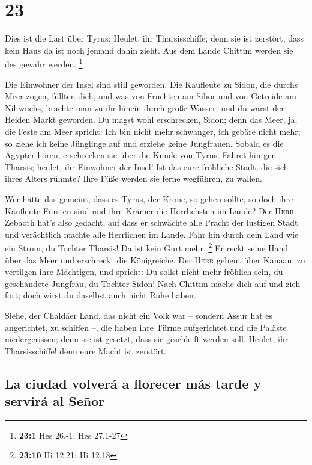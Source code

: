 \hypertarget{section-22}{%
\section{23}\label{section-22}}

 Dies ist die Last über Tyrus: Heulet, ihr Tharsisschiffe;
denn sie ist zerstört, dass kein Haus da ist noch jemand dahin zieht.
Aus dem Lande Chittim werden sie des gewahr werden. \footnote{\textbf{23:1}
  Hes 26,-1; Hes 27,1-27}

 Die Einwohner der Insel sind still geworden. Die
Kaufleute zu Sidon, die durchs Meer zogen, füllten dich, 
und was von Früchten am Sihor und von Getreide am Nil wuchs, brachte man
zu ihr hinein durch große Wasser; und du warst der Heiden Markt
geworden.  Du magst wohl erschrecken, Sidon; denn das
Meer, ja, die Feste am Meer spricht: Ich bin nicht mehr schwanger, ich
gebäre nicht mehr; so ziehe ich keine Jünglinge auf und erziehe keine
Jungfrauen.  Sobald es die Ägypter hören, erschrecken sie
über die Kunde von Tyrus.  Fahret hin gen Tharsis; heulet,
ihr Einwohner der Insel!  Ist das eure fröhliche Stadt,
die sich ihres Alters rühmte? Ihre Füße werden sie ferne wegführen, zu
wallen.

 Wer hätte das gemeint, dass es Tyrus, der Krone, so gehen
sollte, so doch ihre Kaufleute Fürsten sind und ihre Krämer die
Herrlichsten im Lande?  Der \textsc{Herr} Zebaoth hat's
also gedacht, auf dass er schwächte alle Pracht der lustigen Stadt und
verächtlich machte alle Herrlichen im Lande.  Fahr hin
durch dein Land wie ein Strom, du Tochter Tharsis! Da ist kein Gurt
mehr. \footnote{\textbf{23:10} Hi 12,21; Hi 12,18}  Er
reckt seine Hand über das Meer und erschreckt die Königreiche. Der
\textsc{Herr} gebeut über Kanaan, zu vertilgen ihre Mächtigen,
 und spricht: Du sollst nicht mehr fröhlich sein, du
geschändete Jungfrau, du Tochter Sidon! Nach Chittim mache dich auf und
zieh fort; doch wirst du daselbst auch nicht Ruhe haben.

 Siehe, der Chaldäer Land, das nicht ein Volk war --
sondern Assur hat es angerichtet, zu schiffen --, die haben ihre Türme
aufgerichtet und die Paläste niedergerissen; denn sie ist gesetzt, dass
sie geschleift werden soll.  Heulet, ihr Tharsisschiffe!
denn eure Macht ist zerstört.

\hypertarget{la-ciudad-volveruxe1-a-florecer-muxe1s-tarde-y-serviruxe1-al-seuxf1or}{%
\subsection{La ciudad volverá a florecer más tarde y servirá al
Señor}\label{la-ciudad-volveruxe1-a-florecer-muxe1s-tarde-y-serviruxe1-al-seuxf1or}}

